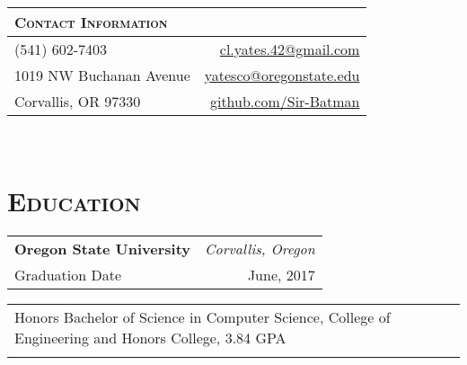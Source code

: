 \documentclass[letterpaper,10pt,titlepage]{article}
\begin{document}
\pagestyle{empty}%
\par{\bigskip\par}%

\begin{tabularx}{\linewidth}{Xr}%
\textsc{Contact Information} & \\\hline
(541) 602-7403 & \href{mailto:cl.yates.42@gmail.com}{cl.yates.42@gmail.com}\\
1019 NW Buchanan Avenue & \href{mailto:yatesco@onid.orst.edu}{yatesco@oregonstate.edu}\\
Corvallis, OR 97330 & \href{http://github.com/Sir-Batman}{github.com/Sir-Batman}\\
\end{tabularx}%
\\%


\section*{\textsc{Education}}
\begin{tabularx}{\textwidth}{Xr}
\textbf{Oregon State University} & \textit{Corvallis, Oregon} \\
Graduation Date         & June, 2017 \\
\end{tabularx}
\begin{tabularx}{\textwidth}{X}
Honors Bachelor of Science in Computer Science, College of Engineering and Honors College, 3.84 GPA \\\\
\end{tabularx}

\begin{comment} %
\begin{tabularx}{\textwidth}{Xr}
\textbf{Baker High School} & \textit{Baker City, Oregon} \\
\end{tabularx}
\begin{tabularx}{\textwidth}{X}
Graduated June 2013 as Valedictorian with an Oregon Honors Diploma and Baker High School Honors Diploma \\\\
\end{tabularx}
\end{comment}
\end{document}
